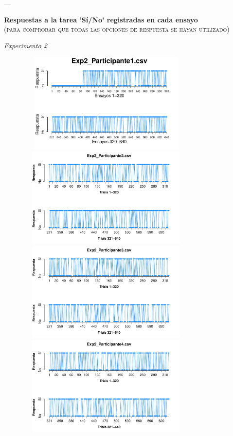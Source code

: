 \documentclass[a4paper ]{article}
\begin{document}
---
\vspace{3mm}
\begin{center}
{\LARGE \textbf{Respuestas a la tarea 'Sí/No' registradas en cada ensayo}}\\
{\small \textsc{(para comprobar que todas las opciones de respuesta se hayan utilizado)}}\\
\smallskip
\end{center}
\begin{center}
{\LARGE \textit{Experimento 2}}\\
\end{center}
\vspace{3mm}
\begin{figure}[th]
\centering
\includegraphics[width=9cm, height=5cm]{Figures/Response_Exp2_P1} \includegraphics[width=9cm, height=5cm]{Figures/Response_Exp2_P2} 
\includegraphics[width=9cm, height=5cm]{Figures/Response_Exp2_P3} \includegraphics[width=9cm, height=5cm]{Figures/Response_Exp2_P4} 

\end{figure}
\end{document}
